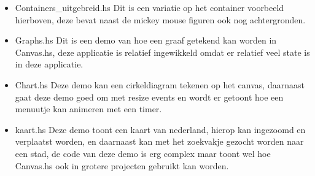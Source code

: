 \begin{itemize}
    \item Containers_uitgebreid.hs
Dit is een variatie op het container voorbeeld hierboven, deze bevat naast de mickey mouse figuren ook nog achtergronden.
    \item Graphs.hs
Dit is een demo van hoe een graaf getekend kan worden in Canvas.hs, deze applicatie is relatief ingewikkeld omdat er relatief veel state is in deze applicatie.
    \item Chart.hs
Deze demo kan een cirkeldiagram tekenen op het canvas, daarnaast gaat deze demo goed om met resize events en wordt er getoont hoe een menuutje kan animeren met een timer.
    \item kaart.hs
Deze demo toont een kaart van nederland, hierop kan ingezoomd en verplaatst worden, en daarnaast kan met het zoekvakje gezocht worden naar een stad, de code van deze demo is erg complex maar toont wel hoe Canvas.hs ook in grotere projecten gebruikt kan worden.
\end{itemize}

